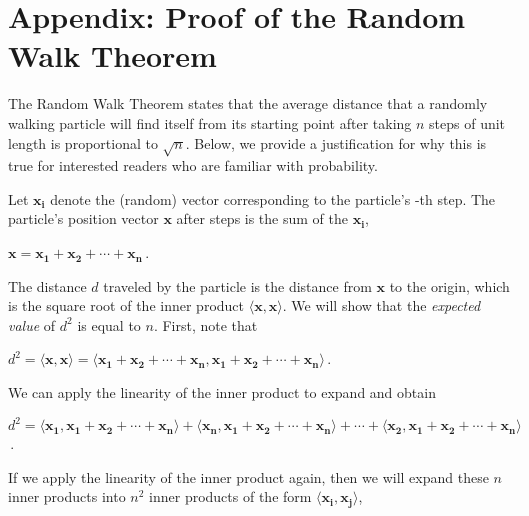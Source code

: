 \chapter[Appendix: Proof of the Random Walk Theorem]{Appendix: Proof of the Random Walk Theorem}
\label{chapter:random_walk_theorem}
\renewcommand{\chaptertitle}{Appendix: Proof of the Random Walk Theorem}

The Random Walk Theorem states that the average distance that a randomly walking particle will find itself from its starting point after taking $n$ steps of unit length is proportional to $\sqrt{n}$. Below, we provide a justification for why this is true for interested readers who are familiar with probability.

Let $\mathbf{x_i}$ denote the (random) vector corresponding to the particle's -th step. The particle's position vector $\mathbf{x}$ after  steps is the sum of the $\mathbf{x_i}$,

\begin{center}
$\mathbf{x} = \mathbf{x_1} + \mathbf{x_2} + \cdots + \mathbf{x_n}$\,.
\end{center}

The distance $d$ traveled by the particle is the distance from $\mathbf{x}$ to the origin, which is the square root of the inner product $\langle \mathbf{x}, \mathbf{x} \rangle$. We will show that the \textit{expected value} of $d^2$ is equal to $n$. First, note that

\begin{center}
$d^2 = \langle \mathbf{x}, \mathbf{x} \rangle = \langle \mathbf{x_1} + \mathbf{x_2} + \cdots + \mathbf{x_n}, \mathbf{x_1} + \mathbf{x_2} + \cdots + \mathbf{x_n} \rangle$\,.
\end{center}

\noindent We can apply the linearity of the inner product to expand and obtain
\begin{center}
$d^2 = \langle \mathbf{x_1}, \mathbf{x_1} + \mathbf{x_2} + \cdots + \mathbf{x_n} \rangle + \langle \mathbf{x_n}, \mathbf{x_1} + \mathbf{x_2} + \cdots + \mathbf{x_n} \rangle + \cdots + \langle \mathbf{x_2}, \mathbf{x_1} + \mathbf{x_2} + \cdots + \mathbf{x_n} \rangle$\,.
\end{center}

\noindent If we apply the linearity of the inner product again, then we will expand these $n$ inner products into $n^2$ inner products of the form $\langle \mathbf{x_i}, \mathbf{x_j} \rangle$,

